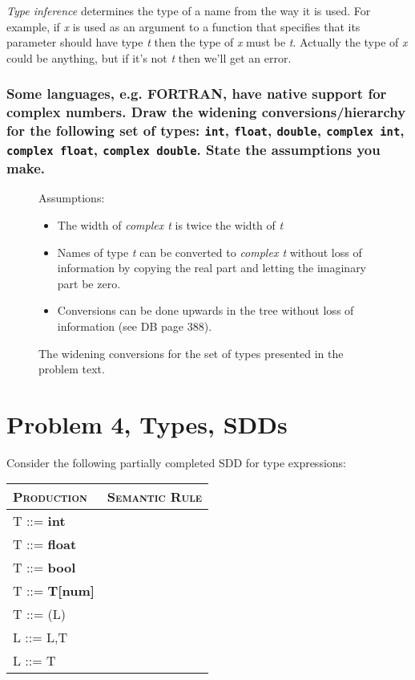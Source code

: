 \emph{Type inference} determines the type of a name from the way it is used.
For example, if \emph{x} is used as an argument to a function that specifies that its parameter should have type \emph{t} then the type of \emph{x} must be \emph{t}.
Actually the type of \emph{x} could be anything, but if it's not \emph{t} then we'll get an error.

\subsubsection{Some languages, e.g. FORTRAN, have native support for complex numbers. Draw the widening conversions/hierarchy for the following set of types: \texttt{int}, \texttt{float}, \texttt{double}, \texttt{complex int}, \texttt{complex float}, \texttt{complex double}. State the assumptions you make.}
\begin{figure}[H]
Assumptions: 
\begin{itemize}
	\item The width of \emph{complex t} is twice the width of \emph{t} 
	\item Names of type \emph{t} can be converted to \emph{complex t} without loss of information by copying the real part and letting the imaginary part be zero.
	\item Conversions can be done upwards in the tree without loss of information (see \textsc{DB} page 388).
\end{itemize}
\end{figure}

\begin{figure}[H]
\centering

\caption{The widening conversions for the set of types presented in the problem text.}
\label{fig:3-b}
\end{figure}

\newpage
\setcounter{subsubsection}{0}
\section{Problem 4, Types, SDDs}
Consider the following partially completed SDD for type expressions:
\begin{table}[H]
\begin{tabular}{ll}
	\textsc{Production} & \textsc{Semantic Rule} \\ \hline
	T ::= \textbf{int}	&						\\
	T ::= \textbf{float}& \\
	T ::= \textbf{bool} & \\
	T ::= \textbf{T[num]}& \\
	T ::= (L) 			& \\
	L ::= L,T			& \\
	L ::= T				& \\
\end{tabular}
\end{table}

